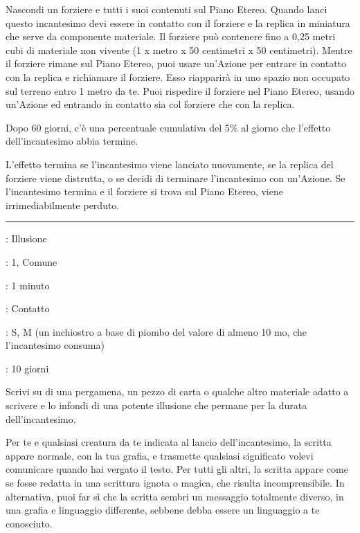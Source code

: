 \begin{multicols}{2}
Nascondi un forziere e tutti i suoi contenuti sul Piano Etereo. Quando lanci questo incantesimo devi essere in contatto con il forziere e la replica in miniatura che serve da componente materiale. Il forziere può contenere fino a 0,25 metri cubi di materiale non vivente (1 x metro x 50 centimetri x 50 centimetri). Mentre il forziere rimane sul Piano Etereo, puoi usare un'Azione per entrare in contatto con la replica e richiamare il forziere. Esso riapparirà in uno spazio non occupato sul terreno entro 1 metro da te. Puoi rispedire il forziere nel Piano Etereo, usando un'Azione ed entrando in contatto sia col forziere che con la replica.

Dopo 60 giorni, c'è una percentuale cumulativa del 5\% al giorno che l'effetto dell'incantesimo abbia termine.

L'effetto termina se l'incantesimo viene lanciato nuovamente, se la replica del forziere viene distrutta, o se decidi di terminare l'incantesimo con un'Azione. Se l'incantesimo termina e il forziere si trova sul Piano Etereo, viene irrimediabilmente perduto.

\smallskip\noindent\rule{\linewidth}{2pt} \hypertarget{Scritto Illusorio}{}\medskip{}
\noindent
\begin{description}[noitemsep, topsep=0pt, parsep=0pt, partopsep=0pt, leftmargin=0cm, labelwidth=2.8cm]
	\item[\textbf{Lista di Magia}]: Illusione
	\item[\textbf{Livello}]: 1, Comune
	\item[\textbf{T. di Lancio}]: 1 minuto
	\item[\textbf{Gittata}]: Contatto
	\item[\textbf{Componenti}]: S, M (un inchiostro a base di piombo del valore di almeno 10 mo, che l'incantesimo consuma)
	\item[\textbf{Durata}]: 10 giorni
\end{description}

Scrivi su di una pergamena, un pezzo di carta o qualche altro materiale adatto a scrivere e lo infondi di una potente illusione che permane per la durata dell'incantesimo.

Per te e qualsiasi creatura da te indicata al lancio dell'incantesimo, la scritta appare normale, con la tua grafia, e trasmette qualsiasi significato volevi comunicare quando hai vergato il testo. Per tutti gli altri, la scritta appare come se fosse redatta in una scrittura ignota o magica, che risulta incomprensibile. In alternativa, puoi far sì che la scritta sembri un messaggio totalmente diverso, in una grafia e linguaggio differente, sebbene debba essere un linguaggio a te conosciuto.


\end{multicols}

